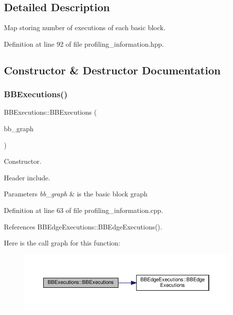 \subsection{Detailed Description}
Map storing number of executions of each basic block. 

Definition at line 92 of file profiling\+\_\+information.\+hpp.



\subsection{Constructor \& Destructor Documentation}
\mbox{\label{classBBExecutions_a1278ac026fd00d35e001ffd01ffb1f38}} 
\subsubsection{\texorpdfstring{B\+B\+Executions()}{BBExecutions()}}
{\footnotesize\ttfamily B\+B\+Executions\+::\+B\+B\+Executions (\begin{DoxyParamCaption}\item[{const \hyperlink{basic__block_8hpp_ab66bdbde3a29e41d079d8a320af9c921}{B\+B\+Graph\+Const\+Ref}}]{bb\+\_\+graph }\end{DoxyParamCaption})\hspace{0.3cm}{\ttfamily [explicit]}}



Constructor. 

Header include.


\begin{DoxyParams}{Parameters}
{\em bb\+\_\+graph} & is the basic block graph \\
\hline
\end{DoxyParams}


Definition at line 63 of file profiling\+\_\+information.\+cpp.



References B\+B\+Edge\+Executions\+::\+B\+B\+Edge\+Executions().

Here is the call graph for this function\+:
\nopagebreak
\begin{figure}[H]
\begin{center}
\leavevmode
\includegraphics[width=350pt]{dd/dc7/classBBExecutions_a1278ac026fd00d35e001ffd01ffb1f38_cgraph}
\end{center}
\end{figure}


